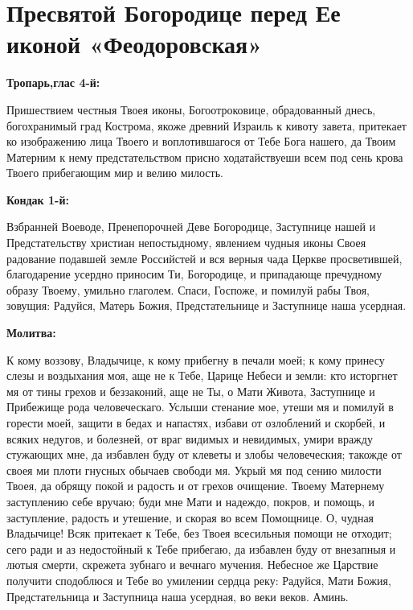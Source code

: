\newpage\section{Пресвятой Богородице перед Ее иконой «Феодоровская»}
 
\bfseries Тропарь,глас 4-й:\normalfont{}


Пришествием честныя Твоея иконы, Богоотроковице, обрадованный днесь, богохранимый град Кострома, якоже древний Израиль к кивоту завета, притекает ко изображению лица Твоего и воплотившагося от Тебе Бога нашего, да Твоим Матерним к нему предстательством присно ходатайствуеши всем под сень крова Твоего прибегающим мир и велию милость.


\medskip
\bfseries Кондак 1-й:\normalfont{}


Взбранней Воеводе, Пренепорочней Деве Богородице, Заступнице нашей и Предстательству христиан непостыдному, явлением чудныя иконы Своея радование подавшей земле Российстей и вся верныя чада Церкве просветившей, благодарение усердно приносим Ти, Богородице, и припадающе пречудному образу Твоему, умильно глаголем. Спаси, Госпоже, и помилуй рабы Твоя, зовущия: Радуйся, Матерь Божия, Предстательнице и Заступнице наша усердная.


\medskip
\bfseries Молитва:\normalfont{}


К кому воззову, Владычице, к кому прибегну в печали моей; к кому принесу слезы и воздыхания моя, аще не к Тебе, Царице Небеси и земли: кто исторгнет мя от тины грехов и беззаконий, аще не Ты, о Мати Живота, Заступнице и Прибежище рода человеческаго. Услыши стенание мое, утеши мя и помилуй в горести моей, защити в бедах и напастях, избави от озлоблений и скорбей, и всяких недугов, и болезней, от враг видимых и невидимых, умири вражду стужающих мне, да избавлен буду от клеветы и злобы человеческия; такожде от своея ми плоти гнусных обычаев свободи мя. Укрый мя под сению милости Твоея, да обрящу покой и радость и от грехов очищение. Твоему Матернему заступлению себе вручаю; буди мне Мати и надеждо, покров, и помощь, и заступление, радость и утешение, и скорая во всем Помощнице. О, чудная Владычице! Всяк притекает к Тебе, без Твоея всесильныя помощи не отходит; сего ради и аз недостойный к Тебе прибегаю, да избавлен буду от внезапныя и лютыя смерти, скрежета зубнаго и вечнаго мучения. Небесное же Царствие получити сподоблюся и Тебе во умилении сердца реку: Радуйся, Мати Божия, Предстательница и Заступница наша усердная, во веки веков. Аминь.

